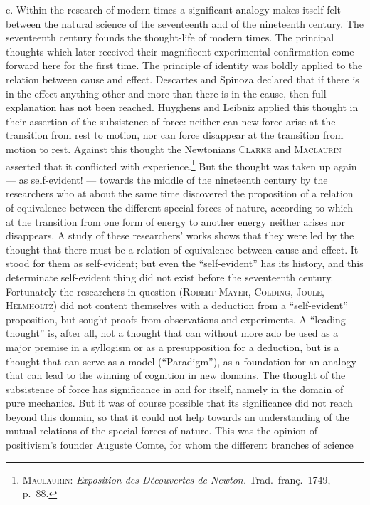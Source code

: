 \documentclass[12pt]{book}
\newcommand{\opage}[1]{\marginnote{\footnotesize\textit{[#1]}}}
\begin{document}
c. Within the research of modern times a significant analogy makes itself felt
between the natural science of the seventeenth and of the nineteenth century. The
seventeenth century founds the thought-life of modern times. The principal
thoughts which later received their magnificent experimental confirmation come
forward here for the first time. The principle of identity was boldly applied to
the relation between cause and effect. Descartes and Spinoza declared that if
there is in the effect anything other and more than there is in the cause, then
full explanation has not been reached. Huyghens and Leibniz applied this thought
in their assertion of the subsistence of force: neither can new force arise at
the transition from rest to motion, nor can force disappear at the transition
from motion to rest. Against this thought the Newtonians \textsc{Clarke} and
\textsc{Maclaurin} asserted that it conflicted with
experience.\footnote{\textsc{Maclaurin:} \textit{Exposition des Découvertes de
Newton.} Trad.\ franç.\ 1749, p.\ 88.} But the thought was taken up again --- as
self-evident! --- towards the middle of the nineteenth century by the researchers
who at about the same time discovered the proposition of a relation of
equivalence between the different special forces of nature, according to which at
the transition from one form of energy to another energy neither arises nor
disappears. A study of these researchers' works shows that they were led by the
thought that there must \opage{76}be a relation of equivalence between cause and effect. It
stood for them as self-evident; but even the ``self-evident'' has its history, and
this determinate self-evident thing did not exist before the seventeenth century.
Fortunately the researchers in question \textsc{(Robert Mayer, Colding, Joule,
Helmholtz)} did not content themselves with a deduction from a ``self-evident''
proposition, but sought proofs from observations and experiments. A ``leading
thought'' is, after all, not a thought that can without more ado be used as a
major premise in a syllogism or as a presupposition for a deduction, but is a
thought that can serve as a model (``Paradigm''), as a foundation for an analogy
that can lead to the winning of cognition in new domains. The thought of the
subsistence of force has significance in and for itself, namely in the domain of
pure mechanics. But it was of course possible that its significance did not reach
beyond this domain, so that it could not help towards an understanding of the
mutual relations of the special forces of nature. This was the opinion of
positivism's founder Auguste Comte, for whom the different branches of science
\end{document}
